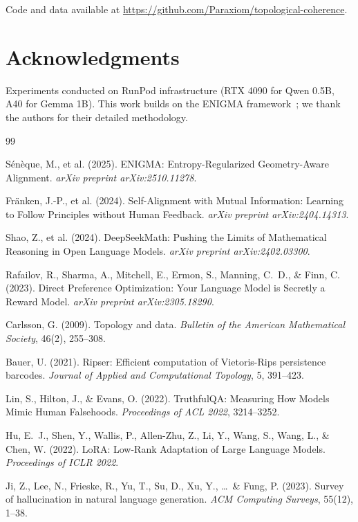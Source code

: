 \documentclass[11pt,a4paper]{article}
\begin{document}
Code and data available at \url{https://github.com/Paraxiom/topological-coherence}.

\section*{Acknowledgments}

Experiments conducted on RunPod infrastructure (RTX 4090 for Qwen 0.5B, A40 for Gemma 1B). This work builds on the ENIGMA framework~\cite{seneque2025enigma}; we thank the authors for their detailed methodology.


\begin{thebibliography}{99}

S\'{e}n\`{e}que, M., et al. (2025).
ENIGMA: Entropy-Regularized Geometry-Aware Alignment.
\textit{arXiv preprint arXiv:2510.11278}.

Fr\"{a}nken, J.-P., et al. (2024).
Self-Alignment with Mutual Information: Learning to Follow Principles without Human Feedback.
\textit{arXiv preprint arXiv:2404.14313}.

Shao, Z., et al. (2024).
DeepSeekMath: Pushing the Limits of Mathematical Reasoning in Open Language Models.
\textit{arXiv preprint arXiv:2402.03300}.

Rafailov, R., Sharma, A., Mitchell, E., Ermon, S., Manning, C.~D., \& Finn, C. (2023).
Direct Preference Optimization: Your Language Model is Secretly a Reward Model.
\textit{arXiv preprint arXiv:2305.18290}.

Carlsson, G. (2009).
Topology and data.
\textit{Bulletin of the American Mathematical Society}, 46(2), 255--308.

Bauer, U. (2021).
Ripser: Efficient computation of Vietoris-Rips persistence barcodes.
\textit{Journal of Applied and Computational Topology}, 5, 391--423.

Lin, S., Hilton, J., \& Evans, O. (2022).
TruthfulQA: Measuring How Models Mimic Human Falsehoods.
\textit{Proceedings of ACL 2022}, 3214--3252.

Hu, E.~J., Shen, Y., Wallis, P., Allen-Zhu, Z., Li, Y., Wang, S., Wang, L., \& Chen, W. (2022).
LoRA: Low-Rank Adaptation of Large Language Models.
\textit{Proceedings of ICLR 2022}.

Ji, Z., Lee, N., Frieske, R., Yu, T., Su, D., Xu, Y., \ldots\ \& Fung, P. (2023).
Survey of hallucination in natural language generation.
\textit{ACM Computing Surveys}, 55(12), 1--38.


\end{thebibliography}
\end{document}
